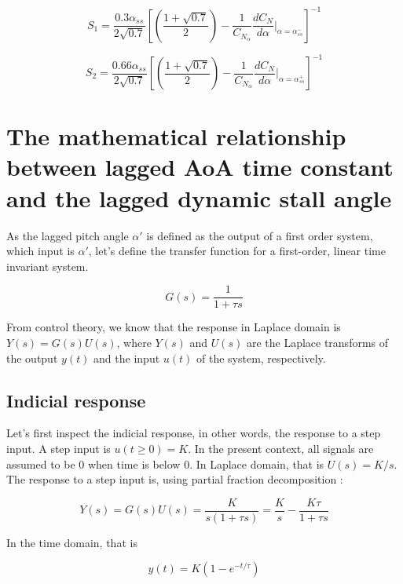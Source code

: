 \begin{equation}
S_1 = \frac{0.3\alpha_{ss}}{2\sqrt{0.7}}\left[\left(\frac{1+\sqrt{0.7}}{2}\right)-\frac{1}{C_{N_\alpha}}\frac{dC_N}{d\alpha}|_{\alpha=\alpha_{ss}^{-}}\right]^{-1}
\end{equation}

\begin{equation}
S_2 = \frac{0.66\alpha_{ss}}{2\sqrt{0.7}}\left[\left(\frac{1+\sqrt{0.7}}{2}\right)-\frac{1}{C_{N_\alpha}}\frac{dC_N}{d\alpha}|_{\alpha=\alpha_{ss}^{+}}\right]^{-1}
\end{equation}

\section{The mathematical relationship between lagged AoA time constant and the lagged dynamic stall angle}

As the lagged pitch angle $\alpha'$ is defined as the output of a first order system, which input is $\alpha'$, let's define the transfer function for a first-order, linear time invariant system. 

\begin{equation}
G(s) = \frac{1}{1+\tau s}
\end{equation}

\noindent From control theory, we know that the response in Laplace domain is $Y(s) = G(s)U(s)$, where $Y(s)$ and $U(s)$ are the Laplace transforms of the output $y(t)$ and the input $u(t)$ of the system, respectively.

\subsection{Indicial response}

Let's first inspect the indicial response, in other words, the response to a step input. A step input is $u(t \geq 0) = K$. In the present context, all signals are assumed to be $0$ when time is below 0. In Laplace domain, that is $U(s) = K/s$. The response to a step input is, using partial fraction decomposition : 

\begin{equation}
Y(s) = G(s)U(s) = \frac{K}{s(1+\tau s)} =\frac{K}{s} - \frac{K\tau}{1+\tau s}
\end{equation}

\noindent In the time domain, that is 

\begin{equation}
y(t) = K(1-e^{-t/\tau})
\end{equation}

